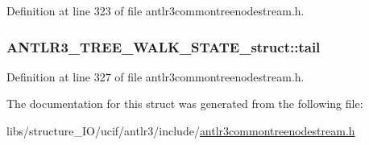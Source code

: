 Definition at line 323 of file antlr3commontreenodestream.\-h.

\hypertarget{struct_a_n_t_l_r3___t_r_e_e___w_a_l_k___s_t_a_t_e__struct_ac7a5c57635cbc5f27a4be6423b76ca0a}{
\subsubsection[{tail}]{ A\-N\-T\-L\-R3\-\_\-\-T\-R\-E\-E\-\_\-\-W\-A\-L\-K\-\_\-\-S\-T\-A\-T\-E\-\_\-struct\-::tail}}\label{struct_a_n_t_l_r3___t_r_e_e___w_a_l_k___s_t_a_t_e__struct_ac7a5c57635cbc5f27a4be6423b76ca0a}


Definition at line 327 of file antlr3commontreenodestream.\-h.



The documentation for this struct was generated from the following file\-:\begin{DoxyCompactItemize}
\item 
libs/structure\-\_\-\-I\-O/ucif/antlr3/include/\hyperlink{antlr3commontreenodestream_8h}{antlr3commontreenodestream.\-h}\end{DoxyCompactItemize}
